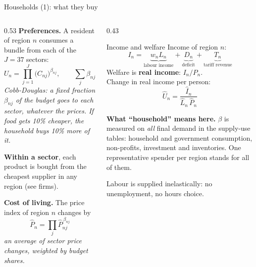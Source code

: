 \documentclass[aspectratio=169,9pt,t]{beamer}
\newcommand{\h}[1]{\hat{#1}}
\newcommand{\key}[1]{\textbf{\color{ipnavy}#1}}
\newcommand{\plain}[1]{{\color{ipgrey}\small\itshape #1}}
\begin{document}
\begin{frame}{Households (1): what they buy}
  \begin{columns}[T]
    \begin{column}{0.53\textwidth}
      \textbf{Preferences.} A resident of region $n$ consumes a bundle from
      each of the $J=37$ sectors:
      \[ U_n=\prod_{j=1}^{J}\big(C_{nj}\big)^{\beta_{nj}},\qquad \sum_j\beta_{nj}=1 . \]
      \plain{Cobb-Douglas: a fixed fraction $\beta_{nj}$ of the budget
      goes to each sector, whatever the prices. If food gets 10\% cheaper,
      the household buys 10\% more of it.}

      \medskip
      \textbf{Within a sector}, each product is bought from the cheapest
      supplier in any region (see firms).

      \textbf{Cost of living.} The price index of region $n$ changes by
      \[ \h P_n=\prod_{j}\h P_{nj}^{\,\beta_{nj}} \]
      \plain{an average of sector price changes, weighted by budget shares.}
    \end{column}
    \begin{column}{0.43\textwidth}
      \begin{block}{Income and welfare}
        \small
        Income of region $n$:
        \[ I_n=\underbrace{w_nL_n}_{\text{labour income}}+\underbrace{D_n}_{\text{deficit}}+\underbrace{T_n}_{\text{tariff revenue}} \]
        Welfare is \key{real income}: $I_n/P_n$.\\[0.4em]
        Change in real income per person:
        \[ \h U_n=\frac{\h I_n}{\h L_n\,\h P_n} \]
      \end{block}
      \small
      \textbf{What ``household'' means here.} $\beta$ is measured on
      \emph{all} final demand in the supply-use tables: household and
      government consumption, non-profits, investment and inventories. One
      representative spender per region stands for all of them.

      \smallskip
      Labour is supplied inelastically: no unemployment, no hours choice.
    \end{column}
  \end{columns}
\end{frame}
\end{document}
